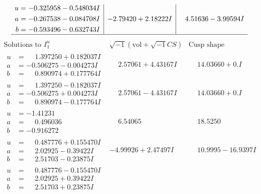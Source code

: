 \documentclass[1p]{elsarticle_modified}
\theoremstyle{definition}
\newcommand{\I}{\sqrt{-1}}
\begin{document}
$$\begin{array}{c|c|c}
\begin{aligned}
u &= -0.325958 - 0.548034 I \\
a &= -0.267538 - 0.084708 I \\
b &= -0.593496 - 0.632743 I\end{aligned}
 & -2.79420 + 2.18222 I & \phantom{-}4.51636 - 3.99594 I\\
 \hline 
 \end{array}$$\newpage$$\begin{array}{c|c|c}  
\text{Solutions to }I^u_{1}& \I (\text{vol} + \sqrt{-1}CS) & \text{Cusp shape}\\
 \hline 
\begin{aligned}
u &= \phantom{-}1.397250 + 0.182037 I \\
a &= -0.506275 - 0.004273 I \\
b &= \phantom{-}0.890974 + 0.177764 I\end{aligned}
 & \phantom{-}2.57061 + 4.43167 I & \phantom{-}14.03660 + 0. I\phantom{ +0.000000I} \\ \hline\begin{aligned}
u &= \phantom{-}1.397250 - 0.182037 I \\
a &= -0.506275 + 0.004273 I \\
b &= \phantom{-}0.890974 - 0.177764 I\end{aligned}
 & \phantom{-}2.57061 - 4.43167 I & \phantom{-}14.03660 + 0. I\phantom{ +0.000000I} \\ \hline\begin{aligned}
u &= -1.41231\phantom{ +0.000000I} \\
a &= \phantom{-}0.496036\phantom{ +0.000000I} \\
b &= -0.916272\phantom{ +0.000000I}\end{aligned}
 & \phantom{-}6.54065\phantom{ +0.000000I} & \phantom{-}18.5250\phantom{ +0.000000I} \\ \hline\begin{aligned}
u &= \phantom{-}0.487776 + 0.155470 I \\
a &= \phantom{-}2.02925 - 0.39422 I \\
b &= \phantom{-}2.51703 - 0.23875 I\end{aligned}
 & -4.99926 + 2.47497 I & \phantom{-}10.9995 - 16.9397 I \\ \hline\begin{aligned}
u &= \phantom{-}0.487776 - 0.155470 I \\
a &= \phantom{-}2.02925 + 0.39422 I \\
b &= \phantom{-}2.51703 + 0.23875 I\end{aligned}

\end{array}$$
\end{document}
